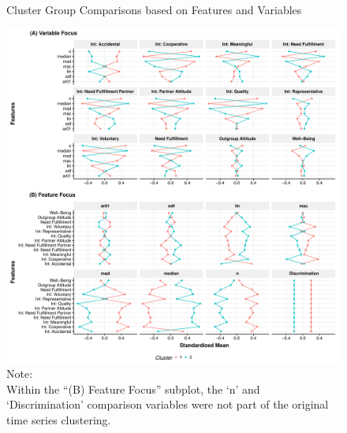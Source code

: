 \documentclass[man, 12pt, a4paper, mask]{apa7}
\theoremstyle{break}
\theoremstyle{plain}
\begin{document}
\begin{figure}[hbtp]
  \caption{Cluster Group Comparisons based on Features and Variables}
  \label{fig:clusterFeatVar}
  \centering\includegraphics[width=\textwidth]{figures/clusterFeatVarComb.pdf}
  \caption*{Note: \\
  Within the ``(B) Feature Focus'' subplot, the `n' and `Discrimination' comparison variables were not part of the original time series clustering.}
\end{figure}
\end{document}
